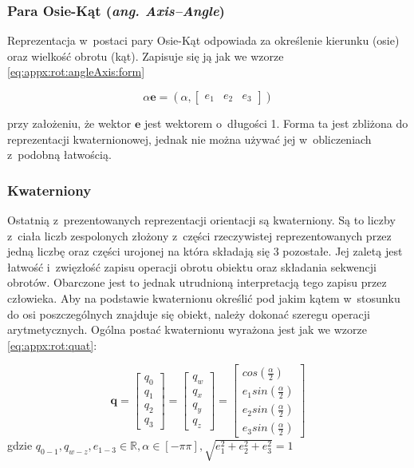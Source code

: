\subsubsection*{Para Osie-Kąt (\emph{ang. Axis--Angle})}
Reprezentacja w~postaci pary Osie-Kąt odpowiada za określenie kierunku (osie) oraz wielkość obrotu (kąt). Zapisuje się ją jak we wzorze \eqref{eq:appx:rot:angleAxis:form}
	
\begin{equation}
	\alpha\mathbf{e} = (\alpha, \begin{bmatrix}e_1 & e_2 & e_3\end{bmatrix})
	\label{eq:appx:rot:angleAxis:form}
\end{equation}
		
przy założeniu, że wektor $\mathbf{e}$ jest wektorem o~długości 1. 
Forma ta jest zbliżona do reprezentacji kwaternionowej, jednak nie można używać jej w~obliczeniach z~podobną łatwością.  
		
\subsubsection*{Kwaterniony}
Ostatnią z~prezentowanych reprezentacji orientacji są kwaterniony. Są to liczby z~ciała liczb zespolonych złożony z~części rzeczywistej reprezentowanych przez jedną liczbę oraz części urojonej na która składają się 3 pozostałe. Jej zaletą jest łatwość i~zwięzłość zapisu operacji obrotu obiektu oraz składania sekwencji obrotów. Obarczone jest to jednak utrudnioną interpretacją tego zapisu przez człowieka. Aby na podstawie kwaternionu określić pod jakim kątem w~stosunku do osi poszczególnych znajduje się obiekt, należy dokonać szeregu operacji arytmetycznych. Ogólna postać kwaternionu wyrażona jest jak we wzorze \eqref{eq:appx:rot:quat}:
		
\begin{equation}
	\label{eq:appx:rot:quat}
	\mathbf{q} =
	\begin{bmatrix}
		q_0 \\
		q_1 \\
		q_2 \\
		q_3 
	\end{bmatrix} 
	= 	
	\begin{bmatrix}
		q_w \\
		q_x \\
		q_y \\
		q_z 
	\end{bmatrix} 
	= 
	\begin{bmatrix}
		cos(\frac{\alpha}{2})    \\
		e_1sin(\frac{\alpha}{2}) \\
		e_2sin(\frac{\alpha}{2}) \\
		e_3sin(\frac{\alpha}{2}) 
	\end{bmatrix}
\end{equation}
gdzie $q_{0-1}, q_{w-z}, e_{1-3} \in \mathbb{R}, \alpha \in [-\pi \pi], \sqrt{e_1^2 + e_2^2 + e_3^2} = 1$
		
